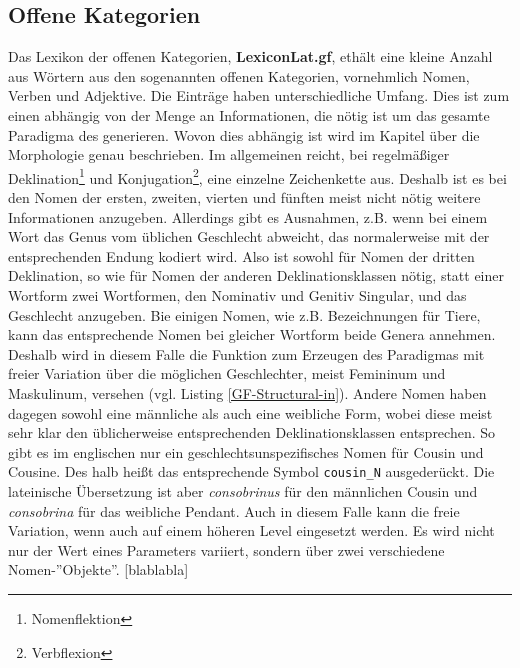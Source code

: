 \documentclass[12pt,abstract=on,titlepage,bibliography=totoc,ngerman,listof=totoc]{scrreprt}
\begin{document}
\subsection{Offene Kategorien}
\label{subsec:offene}
Das Lexikon der offenen Kategorien, \textbf{LexiconLat.gf}, ethält eine kleine Anzahl aus Wörtern aus den sogenannten offenen Kategorien, vornehmlich Nomen, Verben und Adjektive. 
Die Einträge haben unterschiedliche Umfang. Dies ist zum einen abhängig von der Menge an Informationen, die nötig ist um das gesamte Paradigma des generieren. Wovon dies abhängig ist wird im Kapitel über die Morphologie genau beschrieben. Im allgemeinen reicht, bei regelmäßiger Deklination\footnote{Nomenflektion} und Konjugation\footnote{Verbflexion}, eine einzelne Zeichenkette aus. Deshalb ist es bei den Nomen der ersten, zweiten, vierten und fünften meist nicht nötig weitere Informationen anzugeben. Allerdings gibt es Ausnahmen, z.B. wenn bei einem Wort das Genus vom üblichen Geschlecht abweicht, das normalerweise mit der entsprechenden Endung kodiert wird. Also ist sowohl für Nomen der dritten Deklination, so wie für Nomen der anderen Deklinationsklassen nötig, statt einer Wortform zwei Wortformen, den Nominativ und Genitiv Singular, und das Geschlecht anzugeben. Bie einigen Nomen, wie z.B. Bezeichnungen für Tiere, kann das entsprechende Nomen bei gleicher Wortform beide Genera annehmen. Deshalb wird in diesem Falle die Funktion zum Erzeugen des Paradigmas mit freier Variation über die möglichen Geschlechter, meist Femininum und Maskulinum, versehen (vgl. Listing \ref{GF-Structural-in}). Andere Nomen haben dagegen sowohl eine männliche als auch eine weibliche Form, wobei diese meist sehr klar den üblicherweise entsprechenden Deklinationsklassen entsprechen. So gibt es im englischen nur ein geschlechtsunspezifisches Nomen für Cousin und Cousine. Des halb heißt das entsprechende Symbol \texttt{cousin\_N} ausgederückt. Die lateinische Übersetzung ist aber \textit{consobrinus} für den männlichen Cousin und \textit{consobrina} für das weibliche Pendant. Auch in diesem Falle kann die freie Variation, wenn auch auf einem höheren Level eingesetzt werden. Es wird nicht nur der Wert eines Parameters variiert, sondern über zwei verschiedene Nomen-''Objekte''. [blablabla]


\FloatBarrier
\pagebreak
\end{document}
